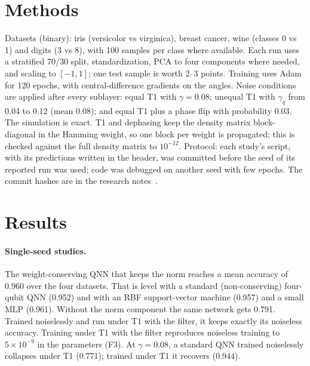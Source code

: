 \documentclass[11pt]{article}
\begin{document}
\section{Methods}

Datasets (binary): iris (versicolor vs virginica), breast cancer, wine (classes 0 vs 1) and digits (3 vs 8),
with 100 samples per class where available. Each run uses a stratified 70/30 split, standardization, PCA to
four components where needed, and scaling to $[-1,1]$; one test sample is worth 2--3 points. Training uses
Adam for 120 epochs, with central-difference gradients on the angles. Noise conditions are applied after every
sublayer: equal T1 with $\gamma=0.08$; unequal T1 with $\gamma_q$ from 0.04 to 0.12 (mean 0.08); and equal
T1 plus a phase flip with probability 0.03. The simulation is exact. T1 and dephasing keep the density matrix
block-diagonal in the Hamming weight, so one block per weight is propagated; this is checked against the full
density matrix to $10^{-12}$. Protocol: each study's script, with its predictions written in the header, was
committed before the seed of its reported run was used; code was debugged on another seed with few epochs.
The commit hashes are in the research notes~\cite{monteverde2026qang}.

\section{Results}

\paragraph{Single-seed studies.} The weight-conserving QNN that keeps the norm reaches a mean accuracy of
0.960 over the four datasets. That is level with a standard (non-conserving) four-qubit QNN (0.952) and with
an RBF support-vector machine (0.957) and a small MLP (0.961). Without the norm component the same network
gets 0.791. Trained noiselessly and run under T1 with the filter, it keeps exactly its noiseless accuracy.
Training under T1 with the filter reproduces noiseless training to $5\times10^{-9}$ in the parameters (F3).
At $\gamma=0.08$, a standard QNN trained noiselessly collapses under T1 (0.771); trained under T1 it
recovers (0.944).
\end{document}
